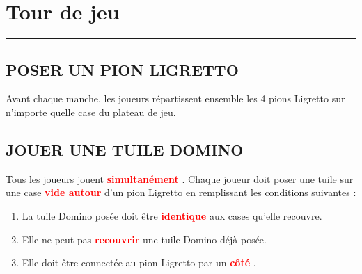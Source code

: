 \documentclass{article}%
\begin{document}
%
\sectionfont{\color{red}}%
\subsectionfont{\color{red}}%
\subsubsectionfont{\color{red}}%
\section{ Tour de jeu
}%
\label{sec:Tourdejeu}%
\textcolor{red}{\rule{18cm}{0.07cm}}\break

%
\subsection{ POSER UN PION LIGRETTO
}%
\label{subsec:POSERUNPIONLIGRETTO}%
Avant chaque manche, les joueurs répartissent ensemble les 4 pions Ligretto sur n’importe quelle case du plateau de jeu.


%
\subsection{ JOUER UNE TUILE DOMINO
}%
\label{subsec:JOUERUNETUILEDOMINO}%
Tous les joueurs jouent %
\textcolor{red}{%
\textbf{simultanément}%
}%
.
%
Chaque joueur doit poser une tuile sur une case %
\textcolor{red}{%
\textbf{vide autour}%
}%
\textit{ }%
 d'un pion Ligretto en remplissant les conditions suivantes :
%
\begin{enumerate}%
\item%
%
 La tuile Domino posée doit être %
\textcolor{red}{%
\textbf{identique}%
}%
\textit{ }%
 aux cases qu'elle recouvre.
%
\item%
%
 Elle ne peut pas %
\textcolor{red}{%
\textbf{recouvrir}%
}%
\textit{ }%
 une tuile Domino déjà posée.
%
\item%
%
 Elle doit être connectée au pion Ligretto par un %
\textcolor{red}{%
\textbf{côté}%
}%
.
%
\end{enumerate}%
\end{document}
